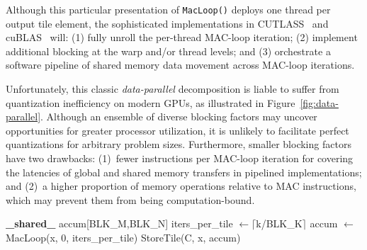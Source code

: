 Although this particular presentation of \lstinline{MacLoop()} deploys one thread per output tile element, the sophisticated implementations in CUTLASS~\cite{Kerr:2017:CUTLASS} and cuBLAS~\cite{Kerr:2017:CUTLASS} will: (1) fully unroll the per-thread MAC-loop iteration; (2) implement additional blocking at the warp and/or thread levels; and (3) orchestrate a software pipeline of shared memory data movement across MAC-loop iterations.

Unfortunately, this classic \emph{data-parallel} decomposition is liable to suffer from quantization inefficiency on modern GPUs, as illustrated in Figure~\ref{fig:data-parallel}. 
Although an ensemble of diverse blocking factors may uncover opportunities for greater processor utilization, it is unlikely to facilitate perfect quantizations for arbitrary problem sizes.  Furthermore, smaller blocking factors have two drawbacks: (1)~fewer instructions per MAC-loop iteration for covering the latencies of global and shared memory transfers in pipelined implementations; and (2)~a higher proportion of memory operations relative to MAC instructions, which may prevent them from being computation-bound.

\begin{algorithm}

  \footnotesize
  \caption{\textit{Data-parallel} GPU GEMM\@.}\label{alg:data_parallel}
  \begin{algorithmic}[1]
  \State \textbf{\_shared\_}  accum[BLK\_M,BLK\_N]
  \State iters\_per\_tile $\gets \lceil$k/BLK\_K$\rceil$
    \State accum $\gets$ MacLoop(x, 0, iters\_per\_tile)
    \State StoreTile(C, x, accum) \EndFork
  \end{algorithmic}
\end{algorithm}

